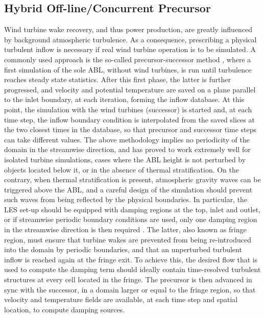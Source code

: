 \documentclass[journal abbreviation, manuscript]{copernicus}
\begin{document}
\subsection{Hybrid Off-line/Concurrent Precursor}
\label{subsec:precursor}
Wind turbine wake recovery, and thus power production, are greatly influenced by background atmospheric turbulence. As a consequence, prescribing a physical turbulent inflow is necessary if real wind turbine operation is to be simulated. A commonly used approach is the so-called precursor-successor method \citep{2012a_ChurchfieldEtAl,2012b_ChurchfieldEtAl}, where a first simulation of the sole ABL, without wind turbines, is run until turbulence reaches steady state statistics. After this first phase, the latter is further progressed, and velocity and potential temperature are saved on a plane parallel to the inlet boundary, at each iteration, forming the inflow database. At this point, the simulation with the wind turbines (successor) is started and, at each time step, the inflow boundary condition is interpolated from the saved slices at the two closest times in the database, so that precursor and successor time steps can take different values. The above methodology implies no periodicity of the domain in the streamwise direction, and has proved to work extremely well for isolated turbine simulations, cases where the ABL height is not perturbed by objects located below it, or in the absence of thermal stratification. On the contrary, when thermal stratification is present, atmospheric gravity waves can be triggered above the ABL, and a careful design of the simulation should prevent such waves from being reflected by the physical boundaries. In particular, the LES set-up should be equipped with damping regions at the top, inlet and outlet, or if streamwise periodic boundary conditions are used, only one damping region in the streamwise direction is then required \citep{2010_CalafEtAl,2014_InoueEtAl,2017a_AllaertsMeyers}. The latter, also known as fringe region, must ensure that turbine wakes are prevented from being re-introduced into the domain by periodic boundaries, and that an unperturbed turbulent inflow is reached again at the fringe exit. To achieve this, the desired flow that is used to compute the damping term should ideally contain time-resolved turbulent structures at every cell located in the fringe. %
The precursor is then advanced in sync with the successor, in a domain larger or equal to the fringe region, so that velocity and temperature fields are available, at each time step and spatial location, to compute damping sources. 
\end{document}
